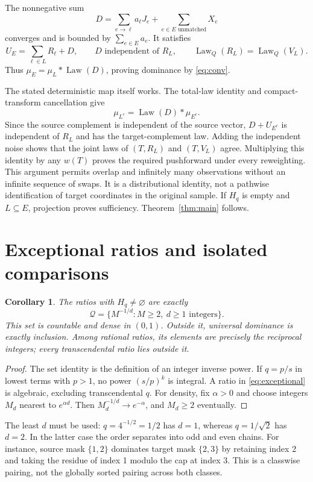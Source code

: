 \documentclass[11pt,a4paper]{article}
\newtheorem{corollary}[theorem]{Corollary}\newtheorem{proposition}[theorem]{Proposition}
\theoremstyle{remark}\newtheorem*{ednote}{Editorial note (ProveIt, 2026-10-01)}
\newcommand{\Law}{\operatorname{Law}}\newcommand{\ind}{\mathbf1}
\begin{document}
The nonnegative sum
\[
 D=\sum_{e\to\ell}a_\ell J_e+
   \sum_{e\in E\text{ unmatched}}X_e
\]
converges and is bounded by $\sum_{e\in E}a_e$. It satisfies
\[
 U_E=\sum_{\ell\in L}R_\ell+D,
 \qquad D\text{ independent of }R_L,
 \qquad \Law_Q(R_L)=\Law_Q(V_L).
\]
Thus $\mu_E=\mu_L*\Law(D)$, proving dominance by \eqref{eq:conv}.

The stated deterministic map itself works. The total-law identity and compact-transform cancellation give
\[
 \mu_{L^c}=\Law(D)*\mu_{E^c}.
\]
Since the source complement is independent of the source vector, $D+U_{E^c}$ is independent of $R_L$ and has the target-complement law. Adding the independent noise shows that the joint laws of $(T,R_L)$ and $(T,V_L)$ agree. Multiplying this identity by any $w(T)$ proves the required pushforward under every reweighting. This argument permits overlap and infinitely many observations without an infinite sequence of swaps. It is a distributional identity, not a pathwise identification of target coordinates in the original sample. If $H_q$ is empty and $L\subseteq E$, projection proves sufficiency. Theorem~\ref{thm:main} follows.

\section{Exceptional ratios and isolated comparisons}
\begin{corollary}\label{cor:exceptional}
The ratios with $H_q\ne\varnothing$ are exactly
\begin{equation}\label{eq:exceptional}
 \mathcal Q=\{M^{-1/d}:M\ge2,\ d\ge1\text{ integers}\}.
\end{equation}
This set is countable and dense in $(0,1)$. Outside it, universal dominance is exactly inclusion. Among rational ratios, its elements are precisely the reciprocal integers; every transcendental ratio lies outside it.
\end{corollary}
\begin{proof}
The set identity is the definition of an integer inverse power. If $q=p/s$ in lowest terms with $p>1$, no power $(s/p)^k$ is integral. A ratio in \eqref{eq:exceptional} is algebraic, excluding transcendental $q$. For density, fix $\alpha>0$ and choose integers $M_d$ nearest to $e^{\alpha d}$. Then $M_d^{-1/d}\to e^{-\alpha}$, and $M_d\ge2$ eventually.
\end{proof}

The least $d$ must be used: $q=4^{-1/2}=1/2$ has $d=1$, whereas $q=1/\sqrt2$ has $d=2$. In the latter case the order separates into odd and even chains. For instance, source mask $\{1,2\}$ dominates target mask $\{2,3\}$ by retaining index 2 and taking the residue of index 1 modulo the cap at index 3. This is a classwise pairing, not the globally sorted pairing across both classes.
\end{document}
